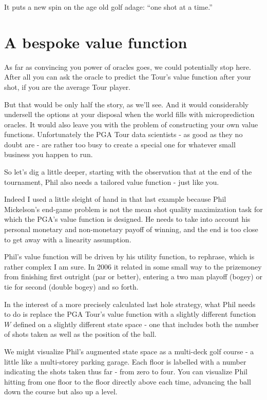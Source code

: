 It puts a new spin on the age old golf adage: ``one shot at a time.'' 


\section{A bespoke value function}
\label{sec:caddy}

As far as convincing you power of oracles goes, we could potentially stop here. After all you can ask the oracle to predict the Tour's value function after your shot, if you are the average Tour player. 

But that would be only half the story, as we'll see. And it would considerably undersell the options at your disposal when the world fills with microprediction oracles. It would also leave you with the problem of constructing your own value functions. Unfortunately the PGA Tour data scientists - as good as they no doubt are - are rather too busy to create a special one for whatever small business you happen to run. 

So let's dig a little deeper, starting with the observation that at the end of the tournament, Phil also needs a tailored value function - just like you.   

Indeed I used a little sleight of hand in that last example because Phil Mickelson's end-game problem is not the mean shot quality maximization task for which the PGA's value function is designed. He needs to take into account his personal monetary and non-monetary payoff of winning, and the end is too close to get away with a linearity assumption.  

Phil's value function will be driven by his utility function, to rephrase, which is rather complex I am sure. In 2006 it related in some small way to the prizemoney from finishing first outright (par or better), entering a two man playoff (bogey) or tie for second (double bogey) and so forth.

In the interest of a more precisely calculated last hole strategy, what Phil needs to do is replace the PGA Tour's value function with a slightly different function $W$ defined on a slightly different state space - one that includes both the number of shots taken as well as the position of the ball. 

We might visualize Phil's augmented state space as a multi-deck golf course - a little like a multi-storey parking garage. Each floor is labelled with a number indicating the shots taken thus far - from zero to four. You can visualize Phil hitting from one floor to the floor directly above each time, advancing the ball down the course but also up a level. 

